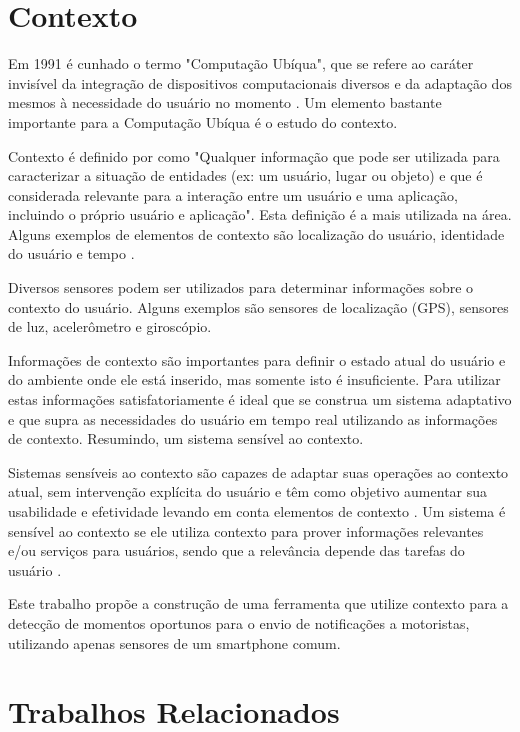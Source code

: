 \section{Contexto}
\label{contexto}

Em 1991 é cunhado o termo "Computação Ubíqua", que se refere ao caráter invisível da integração de dispositivos
computacionais diversos e da adaptação dos mesmos à necessidade do usuário no momento \cite{weiser1991computer}.
Um elemento bastante importante para a Computação Ubíqua é o estudo do contexto.

Contexto é definido por  como "Qualquer informação que pode ser utilizada para
caracterizar a situação de entidades (ex: um usuário, lugar ou objeto) e que é considerada relevante para
a interação entre um usuário e uma aplicação, incluindo o próprio usuário e aplicação". Esta definição é
a mais utilizada na área. Alguns exemplos de elementos de contexto são
localização do usuário, identidade do usuário e tempo \cite{ryan1999enhanced}.

Diversos sensores podem ser utilizados para determinar informações sobre o contexto do usuário. Alguns exemplos são
sensores de localização (GPS), sensores de luz, acelerômetro e giroscópio.

Informações de contexto são importantes para definir o estado atual do usuário e do ambiente onde ele está inserido,
mas somente isto é insuficiente. Para utilizar estas informações satisfatoriamente é ideal que se construa um sistema
adaptativo e que supra as necessidades do usuário em tempo real utilizando as informações de contexto. Resumindo,
um sistema sensível ao contexto.

Sistemas sensíveis ao contexto são capazes de adaptar suas operações ao contexto atual, sem intervenção
explícita do usuário e têm como objetivo aumentar sua usabilidade e efetividade levando em conta elementos
de contexto \cite{baldauf2007survey}.  Um sistema é sensível ao contexto se ele utiliza contexto para prover
informações relevantes e/ou serviços para usuários, sendo que a relevância depende das tarefas do usuário
\cite{abowd1999towards}.

Este trabalho propõe a construção de uma ferramenta que utilize contexto para a detecção de momentos oportunos para
o envio de notificações a motoristas, utilizando apenas sensores de um smartphone comum.

\section{Trabalhos Relacionados}
\label{trabalhos-relacionados}

